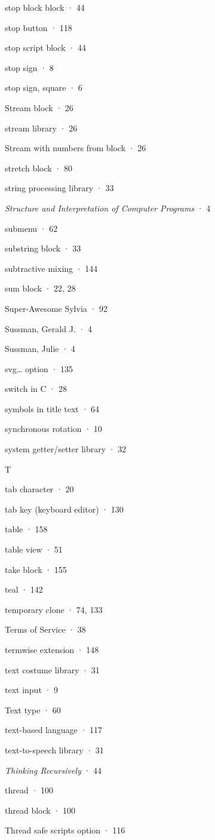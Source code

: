 stop block block · 44

stop button · 118

stop script block · 44

stop sign · 8

stop sign, square · 6

Stream block · 26

stream library · 26

Stream with numbers from block · 26

stretch block · 80

string processing library · 33

\emph{Structure and Interpretation of Computer Programs} · 4

submenu · 62

substring block · 33

subtractive mixing · 144

sum block · 22, 28

Super-Awesome Sylvia · 92

Sussman, Gerald J. · 4

Sussman, Julie · 4

svg\ldots{} option · 135

switch in C · 28

symbols in title text · 64

synchronous rotation · 10

system getter/setter library · 32

T

tab character · 20

tab key (keyboard editor) · 130

table · 158

table view · 51

take block · 155

teal · 142

temporary clone · 74, 133

Terms of Service · 38

termwise extension · 148

text costume library · 31

text input · 9

Text type · 60

text-based language · 117

text-to-speech library · 31

\emph{Thinking Recursively} · 44

thread · 100

thread block · 100

Thread safe scripts option · 116

